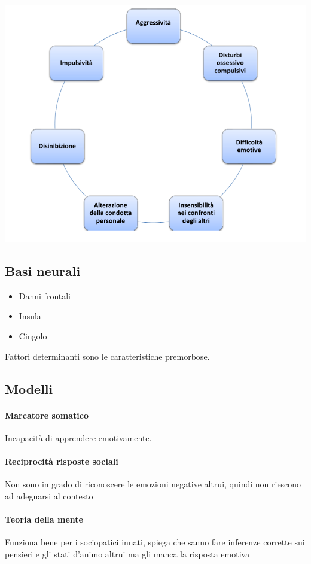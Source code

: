 \documentclass[12pt, a4paper]{article}
\begin{document}
\includegraphics[width=\linewidth]{./images/image2}

\subsection{Basi neurali} 

\begin{itemize}
    \item Danni frontali
    \item Insula
    \item Cingolo
\end{itemize}
Fattori determinanti sono le caratteristiche premorbose.

\subsection{Modelli} 

\paragraph{Marcatore somatico}  Incapacità di apprendere emotivamente.
\paragraph{Reciprocità risposte sociali}  Non sono in grado di riconoscere le emozioni negative altrui, quindi non riescono ad adeguarsi al contesto
\paragraph{Teoria della mente}  Funziona bene per i sociopatici innati, spiega che sanno fare inferenze corrette sui pensieri e gli stati d'animo altrui ma gli manca la risposta emotiva
\end{document}
